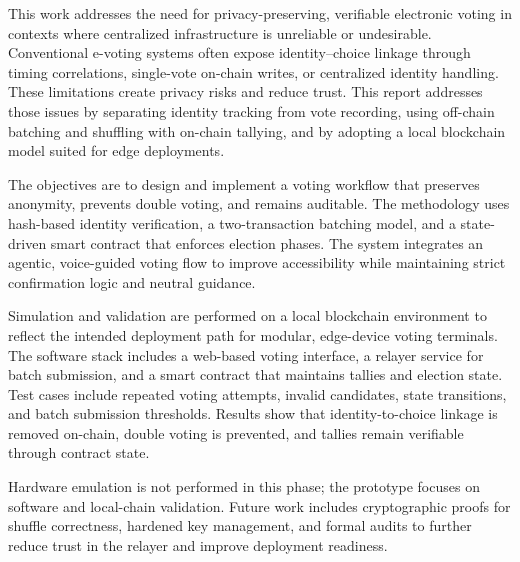 \vspace{-1cm}


This work addresses the need for privacy-preserving, verifiable electronic voting in contexts where centralized infrastructure is unreliable or undesirable. Conventional e-voting systems often expose identity–choice linkage through timing correlations, single-vote on-chain writes, or centralized identity handling. These limitations create privacy risks and reduce trust. This report addresses those issues by separating identity tracking from vote recording, using off-chain batching and shuffling with on-chain tallying, and by adopting a local blockchain model suited for edge deployments.

The objectives are to design and implement a voting workflow that preserves anonymity, prevents double voting, and remains auditable. The methodology uses hash-based identity verification, a two-transaction batching model, and a state-driven smart contract that enforces election phases. The system integrates an agentic, voice-guided voting flow to improve accessibility while maintaining strict confirmation logic and neutral guidance.

Simulation and validation are performed on a local blockchain environment to reflect the intended deployment path for modular, edge-device voting terminals. The software stack includes a web-based voting interface, a relayer service for batch submission, and a smart contract that maintains tallies and election state. Test cases include repeated voting attempts, invalid candidates, state transitions, and batch submission thresholds. Results show that identity-to-choice linkage is removed on-chain, double voting is prevented, and tallies remain verifiable through contract state.

Hardware emulation is not performed in this phase; the prototype focuses on software and local-chain validation. Future work includes cryptographic proofs for shuffle correctness, hardened key management, and formal audits to further reduce trust in the relayer and improve deployment readiness.
 

\pagebreak